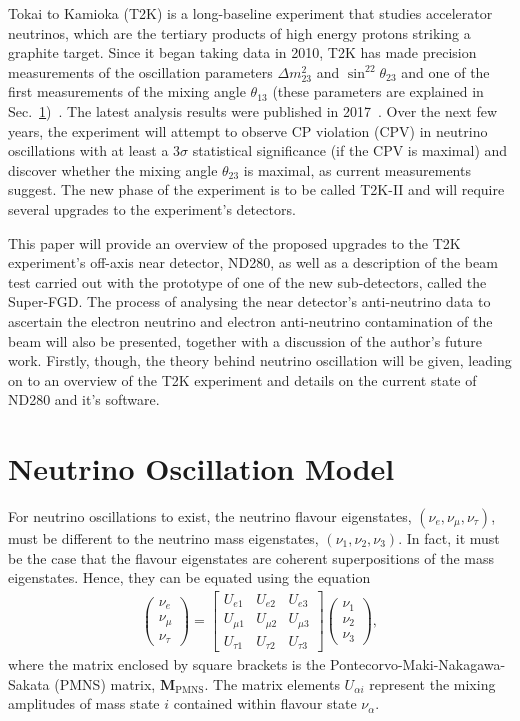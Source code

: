 \documentclass[aps,pra,12pt,notitlepage,tightenlines]{revtex4-1}
\newcommand\matr[1]{\bm{#1}}
\begin{document}
Tokai to Kamioka (T2K) is a long-baseline experiment that studies accelerator neutrinos, which are the tertiary products of high energy protons striking a graphite target. Since it began taking data in 2010, T2K has made precision measurements of the oscillation parameters $\Delta m^2_{23}$ and $\sin^22\theta_{23}$ and one of the first measurements of the mixing angle $\theta_{13}$ (these parameters are explained in Sec.\ \ref{sec:osc})~\cite{PhysRevD.88.032002}. The latest analysis results were published in 2017~\cite{Abe:2017bay}. Over the next few years, the experiment will attempt to observe CP violation (CPV) in neutrino oscillations with at least a 3$\sigma$ statistical significance (if the CPV is maximal) and discover whether the mixing angle $\theta_{23}$ is maximal, as current measurements suggest. The new phase of the experiment is to be called T2K-II and will require several upgrades to the experiment's detectors.

This paper will provide an overview of the proposed upgrades to the T2K experiment's off-axis near detector, ND280, as well as a description of the beam test carried out with the prototype of one of the new sub-detectors, called the Super-FGD. The process of analysing the near detector's anti-neutrino data to ascertain the electron neutrino and electron anti-neutrino contamination of the beam will also be presented, together with a discussion of the author's future work. Firstly, though, the theory behind neutrino oscillation will be given, leading on to an overview of the T2K experiment and details on the current state of ND280 and it's software.

\section{Neutrino Oscillation Model}
\label{sec:osc}
For neutrino oscillations to exist, the neutrino flavour eigenstates, $(\nu_e, \nu_\mu, \nu_\tau)$, must be different to the neutrino mass eigenstates, $(\nu_1, \nu_2, \nu_3)$. In fact, it must be the case that the flavour eigenstates are coherent superpositions of the mass eigenstates. Hence, they can be equated using the equation
\begin{gather}
\label{eq:pmns}
 \begin{pmatrix}
 \nu_e \\
 \nu_\mu \\
 \nu_\tau 
 \end{pmatrix}
 =
 \begin{bmatrix}
 U_{e1} & U_{e2} & U_{e3} \\
 U_{\mu1} & U_{\mu2} & U_{\mu3} \\
 U_{\tau1} & U_{\tau2} & U_{\tau3}
 \end{bmatrix}
 \begin{pmatrix}
  \nu_1 \\
 \nu_2 \\
 \nu_3 
 \end{pmatrix}
 ,
\end{gather}
where the matrix enclosed by square brackets is the Pontecorvo-Maki-Nakagawa-Sakata (PMNS) matrix, $\matr{M}_\mathrm{PMNS}$. The matrix elements $U_{\alpha i}$ represent the mixing amplitudes of mass state $i$ contained within flavour state $\nu_\alpha$.
\end{document}
